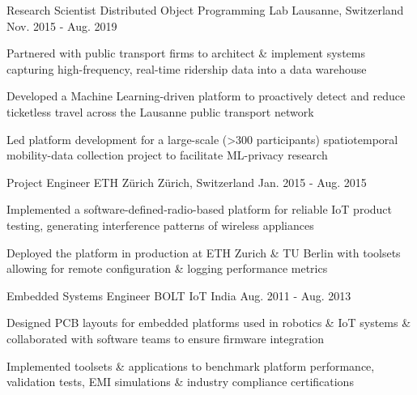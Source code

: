 \begin{cventries}
   \vspace{-0.1cm}

  \cventry
    {Research Scientist} %
    {Distributed Object Programming Lab} %
    {Lausanne, Switzerland} %
    {Nov. 2015 - Aug. 2019} %
    {
      \begin{cvitems} %
      	\item {Partnered with public transport firms to architect \& implement systems capturing high-frequency, real-time ridership data into a data warehouse}
      	\item {Developed a Machine Learning-driven platform to proactively detect and reduce ticketless travel across the Lausanne public transport network}
        \item {Led platform development for a large-scale (>300 participants) spatiotemporal mobility-data collection project to facilitate ML-privacy research}
      \end{cvitems}
    }

	\vspace{-0.1cm}

  \cventry
    {Project Engineer} %
    {ETH Zürich} %
    {Zürich, Switzerland} %
    {Jan. 2015 - Aug. 2015} %
    {
      \begin{cvitems} %
      	\item {Implemented a software-defined-radio-based platform for reliable IoT product testing, generating interference patterns of wireless appliances}
        \item {Deployed the platform in production at ETH Zurich \& TU Berlin with toolsets allowing for remote configuration \& logging performance metrics}
      \end{cvitems}
    }
    
  \vspace{-0.1cm}

  \cventry
    {Embedded Systems Engineer} %
    {BOLT IoT} %
    {India} %
    {Aug. 2011 - Aug. 2013} %
    {
      \begin{cvitems} %
      	\item {Designed PCB layouts for embedded platforms used in robotics \& IoT systems \& collaborated with software teams to ensure firmware integration}
        \item {Implemented toolsets \& applications to benchmark platform performance, validation tests, EMI simulations \& industry compliance certifications}
      \end{cvitems}
    }
    
    \vspace{-0.4cm}

\end{cventries}
